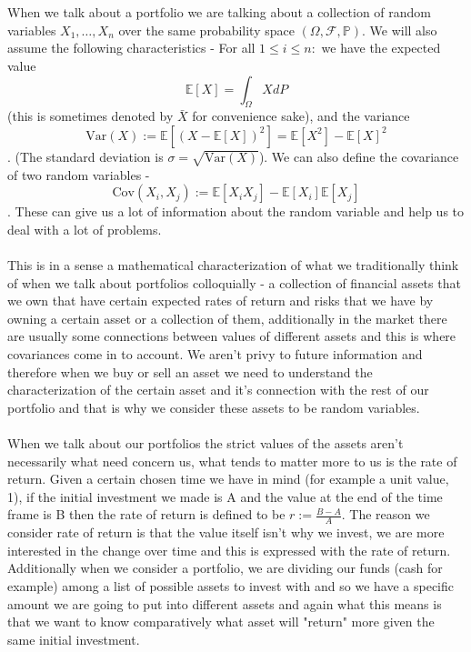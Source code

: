\documentclass{article}
\begin{document}
\\\\
When we talk about a portfolio we are talking about a collection of random variables $X_1,\dots,X_n$ over the same probability space $(\Omega,\mathcal{F},\mathbb{P})$. We will also assume the following characteristics - For all $1\leq i\leq n:$ we have the expected value \[\mathbb{E}[X] = \int_{\Omega} XdP\] (this is sometimes denoted by $\bar{X}$ for convenience sake), and the variance \[\text{Var}(X):=\mathbb{E}[(X-\mathbb{E}[X])^2]=\mathbb{E}[X^2]-\mathbb{E}[X]^2\].
(The standard deviation is $\sigma=\sqrt{\text{Var}(X)}$). We can also define the covariance of two random variables - \[\text{Cov}(X_i,X_j):=\mathbb{E}[X_i X_j]-\mathbb{E}[X_i]\mathbb{E}[X_j]\]. These can give us a lot of information about the random variable and help us to deal with a lot of problems. \\\\
This is in a sense a mathematical characterization of what we traditionally think of when we talk about portfolios colloquially - a collection of financial assets that we own that have certain expected rates of return and risks that we have by owning a certain asset or a collection of them, additionally in the market there are usually some connections between values of different assets and this is where covariances come in to account. We aren't privy to future information and therefore when we buy or sell an asset we need to understand the characterization of the certain asset and it's connection with the rest of our portfolio and that is why we consider these assets to be random variables.\\\\
When we talk about our portfolios the strict values of the assets aren't necessarily what need concern us, what tends to matter more to us is the rate of return. Given a certain chosen time we have in mind (for example a unit value, 1), if the initial investment we made is A and the value at the end of the time frame is B then the rate of return is defined to be $r:=\frac{B-A}{A}$. The reason we consider rate of return is that the value itself isn't why we invest, we are more interested in the change over time and this is expressed with the rate of return. Additionally when we consider a portfolio, we are dividing our funds (cash for example) among a list of possible assets to invest with and so we have a specific amount we are going to put into different assets and again what this means is that we want to know comparatively what asset will "return" more given the same initial investment.\\\\
\end{document}
